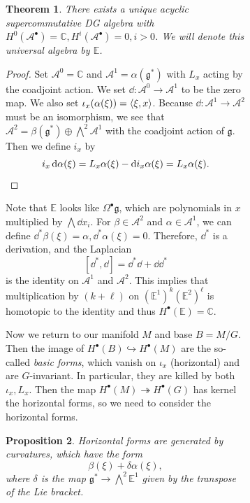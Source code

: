 \documentclass[leqno, openany]{memoir}
\newtheorem{thm}{Theorem}[section]
\newtheorem{prop}[thm]{Proposition}
\theoremstyle{definition}
\theoremstyle{remark}
\theoremstyle{plain}
\theoremstyle{definition}
\theoremstyle{remark}
\newcommand{\C}{\mathbb{C}}
\newcommand{\E}{\mathbb{E}}
\newcommand{\mc}[1]{\mathcal{#1}}
\newcommand{\mf}[1]{\mathfrak{#1}}
\begin{document}
\begin{figure}[H]
\begin{figure}[H]
\begin{thm} There exists a unique acyclic supercommutative DG algebra with
$H^0(\mc{A}^{\bullet}) = \C, H^i(\mc{A}^{\bullet}) = 0, i > 0$. We will denote
this universal algebra by $\mathbb{E}$.  \end{thm}

\begin{proof} Set $\mc{A}^0 = \C$ and $\mc{A}^1 = \alpha(\mf{g}^*)$ with $L_x$
    acting by the coadjoint action. We set $\dd \colon \mc{A}^0 \to \mc{A}^1$
    to be the zero map. We also set $\iota_x(\alpha(\xi)) = \ev{\xi, x}$.
    Because $\dd \colon \mc{A}^1 \to \mc{A}^2$ must be an isomorphism, we see
    that $\mc{A}^2 = \beta(\mf{g}^*) \oplus \bigwedge^2 \mc{A}^1$ with the
    coadjoint action of $\mf{g}$. Then we define $i_x$ by \[ i_x
    \dd{\alpha(\xi)} = L_x \alpha(\xi) - \dd i_x \alpha(\xi) = L_x \alpha(\xi).
\qedhere \] \end{proof}

Note that $\E$ looks like $\Omega^{\bullet} \mf{g}$, which are polynomials in
$x$ multiplied by $\bigwedge \dd{x_i}$. For $\beta \in \mc{A}^2$ and $\alpha
\in \mc{A}^1$, we can define $\dd^*{\beta}(\xi) = \alpha, \dd^* \alpha(\xi) =
0$. Therefore, $\dd^*$ is a derivation, and the Laplacian \[ [\dd^*, \dd] =
\dd^* \dd + \dd \dd^* \] is the identity on $\mc{A}^1$ and $\mc{A}^2$. This
implies that multiplication by $(k+\ell)$ on ${(\E^1)}^k {(\E^2)}^{\ell}$ is
homotopic to the identity and thus $H^{\bullet}(\E) = \C$.

Now we return to our manifold $M$ and base $B = M/G$. Then the image of
$H^{\bullet}(B) \hookrightarrow H^{\bullet}(M)$ are the so-called \textit{basic
forms}, which vanish on $\iota_x$ (horizontal) and are $G$-invariant. In
particular, they are killed by both $\iota_x, L_x$. Then the map
$H^{\bullet}(M) \twoheadrightarrow H^{\bullet}(G)$ has kernel the horizontal
forms, so we need to consider the horizontal forms.

\begin{prop} Horizontal forms are generated by \textit{curvatures}, which have
    the form \[ \beta(\xi) + \delta \alpha(\xi), \] where $\delta$ is the map
$\mf{g}^* \to \bigwedge^2 \E^1$ given by the transpose of the Lie bracket.
\end{prop}


\end{figure}
\end{figure}
\end{document}
